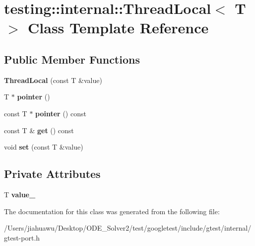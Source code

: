 \hypertarget{classtesting_1_1internal_1_1_thread_local}{}\section{testing\+:\+:internal\+:\+:Thread\+Local$<$ T $>$ Class Template Reference}
\label{classtesting_1_1internal_1_1_thread_local}
\subsection*{Public Member Functions}
\begin{DoxyCompactItemize}
\item 
\mbox{\label{classtesting_1_1internal_1_1_thread_local_a85610bdfdbc93a4c56215e0aad7da870}} 
{\bfseries Thread\+Local} (const T \&value)
\item 
\mbox{\label{classtesting_1_1internal_1_1_thread_local_a882f57fed4b074de83693c0c0fe62858}} 
T $\ast$ {\bfseries pointer} ()
\item 
\mbox{\label{classtesting_1_1internal_1_1_thread_local_a57e45bb60e3cd94abb04fa449e9f0367}} 
const T $\ast$ {\bfseries pointer} () const
\item 
\mbox{\label{classtesting_1_1internal_1_1_thread_local_ac56aeb97991824979bf192c63d1466f8}} 
const T \& {\bfseries get} () const
\item 
\mbox{\label{classtesting_1_1internal_1_1_thread_local_ab5ebc7ba07426cef7167afa2a7707eb4}} 
void {\bfseries set} (const T \&value)
\end{DoxyCompactItemize}
\subsection*{Private Attributes}
\begin{DoxyCompactItemize}
\item 
\mbox{\label{classtesting_1_1internal_1_1_thread_local_ae0db6b57bdb752feb343ee4d935708e2}} 
T {\bfseries value\+\_\+}
\end{DoxyCompactItemize}


The documentation for this class was generated from the following file\+:\begin{DoxyCompactItemize}
\item 
/\+Users/jiahuawu/\+Desktop/\+O\+D\+E\+\_\+\+Solver2/test/googletest/include/gtest/internal/gtest-\/port.\+h\end{DoxyCompactItemize}
